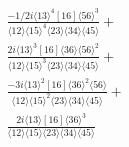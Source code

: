\documentclass[varwidth, border=5pt]{standalone}
\begin{document}
\begin{my}
$\begin{gathered}
\scriptscriptstyle\frac{-1/2i\langle13\rangle^4[16]\langle56\rangle^3}{\langle12\rangle\langle15\rangle^4\langle23\rangle\langle34\rangle\langle45\rangle}+\\
\scriptscriptstyle\frac{2i\langle13\rangle^3[16]\langle36\rangle\langle56\rangle^2}{\langle12\rangle\langle15\rangle^3\langle23\rangle\langle34\rangle\langle45\rangle}+\\
\scriptscriptstyle\frac{-3i\langle13\rangle^2[16]\langle36\rangle^2\langle56\rangle}{\langle12\rangle\langle15\rangle^2\langle23\rangle\langle34\rangle\langle45\rangle}+\\
\scriptscriptstyle\frac{2i\langle13\rangle[16]\langle36\rangle^3}{\langle12\rangle\langle15\rangle\langle23\rangle\langle34\rangle\langle45\rangle}\phantom{+}
\end{gathered}$
\end{my}
\end{document}
